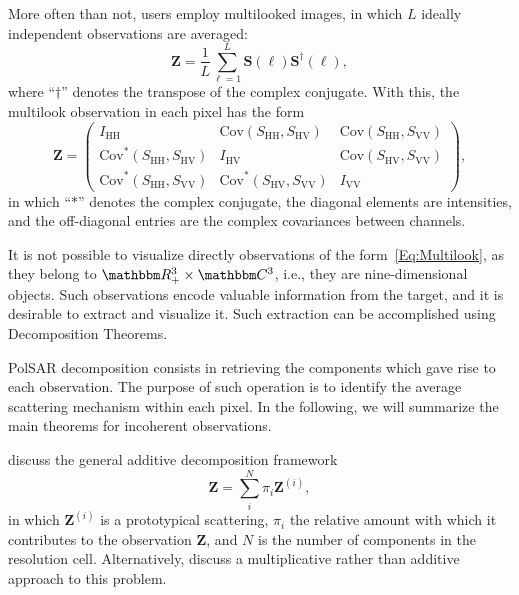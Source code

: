 \documentclass{article}
\begin{document}
More often than not, users employ multilooked images, in which $L$ ideally independent observations are averaged:
\begin{equation}
\bm Z = \frac{1}{L} \sum_{\ell=1}^L \bm S(\ell) \bm S^\dag(\ell),
\end{equation}
where ``$\dag$'' denotes the transpose of the complex conjugate.
With this, the multilook observation in each pixel has the form
\begin{equation}
\bm Z = \begin{pmatrix}
I_{\text{HH}} & \text{Cov}(S_{\text{HH}},S_\text{HV}) & \text{Cov}(S_{\text{HH}},S_\text{VV}) \\
\text{Cov}^*(S_{\text{HH}},S_\text{HV}) & I_{\text{HV}} & \text{Cov}(S_{\text{HV}},S_\text{VV})\\
\text{Cov}^*(S_{\text{HH}},S_\text{VV}) & \text{Cov}^*(S_{\text{HV}},S_\text{VV}) & I_{\text{VV}}
\end{pmatrix},
\label{Eq:Multilook}
\end{equation}
in which ``$*$'' denotes the complex conjugate, the diagonal elements are intensities, and the off-diagonal entries are the complex covariances between channels.

It is not possible to visualize directly observations of the form~\eqref{Eq:Multilook}, as they belong to $\mathbbm R_+^3\times \mathbbm C^3$, i.e., they are nine-dimensional objects.
Such observations encode valuable information from the target, and it is desirable to extract and visualize it.
Such extraction can be accomplished using Decomposition Theorems.


PolSAR decomposition consists in retrieving the components which gave rise to each observation.
The purpose of such operation is to identify the average scattering mechanism within each pixel.
In the following, we will summarize the main theorems for incoherent observations.

\citet{ModelingandInterpretationofScatteringMechanismsinPolarimetricSyntheticApertureRadarAdvancesandPerspectives2014} discuss the general additive decomposition framework
\begin{equation}
\bm Z = \sum_i^N \pi_i \bm Z^{(i)},
\end{equation}
in which $\bm Z^{(i)}$ is a prototypical scattering, 
$\pi_i$ the relative amount with which it contributes to the observation $\bm Z$, and $N$ is the number of components in the resolution cell.
Alternatively, \citet{APolSARScatteringPowerFactorizationFrameworkandNovelRollInvariantParametersBasedUnsupervisedClassificationSchemeUsingaGeodesicDistanceinpress} discuss a multiplicative rather than additive approach to this problem.
\end{document}
